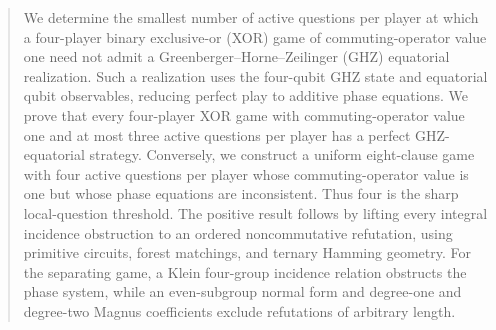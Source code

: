 \documentclass[11pt]{article}
\theoremstyle{definition}
\theoremstyle{remark}
\numberwithin{equation}{section}
\begin{document}
\endgroup
\begin{abstract}


We determine the smallest number of active questions per player at which a
four-player binary exclusive-or (XOR) game of commuting-operator value one
need not admit a Greenberger--Horne--Zeilinger (GHZ) equatorial realization.
Such a realization uses the four-qubit GHZ state and equatorial qubit
observables, reducing perfect play to additive phase equations. We prove that
every four-player XOR game with commuting-operator value one and at most three
active questions per player has a perfect GHZ-equatorial strategy. Conversely,
we construct a uniform eight-clause game with four active questions per player
whose commuting-operator value is one but whose phase equations are
inconsistent. Thus four is the sharp local-question threshold. The positive
result follows by lifting every integral incidence obstruction to an ordered
noncommutative refutation, using primitive circuits, forest matchings, and
ternary Hamming geometry. For the separating game, a Klein four-group
incidence relation obstructs the phase system, while an even-subgroup normal
form and degree-one and degree-two Magnus coefficients exclude refutations of
arbitrary length.
\end{abstract}
\end{document}
